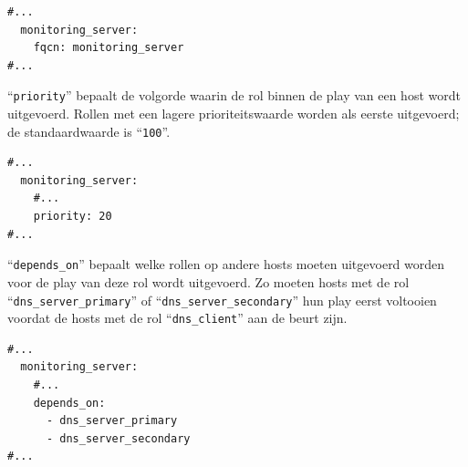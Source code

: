 \begin{codeblockfixed}
  \begin{codeblock}
    \begin{verbatim}
#...
  monitoring_server:
    fqcn: monitoring_server
#...
\end{verbatim}
    \caption[``\texttt{fqcn}'' in ``\texttt{role-config.yml}'']{``\texttt{fqcn}''-key (``\emph{Fully Qualified Collection Name}'') van een rol in ``\texttt{role-config.yml}''}
    \label{code:vb_roleconfig_fqcn}
  \end{codeblock}
\end{codeblockfixed}

``\texttt{priority}'' bepaalt de volgorde waarin de rol binnen de play van een host wordt uitgevoerd. Rollen met een lagere prioriteitswaarde worden als eerste uitgevoerd; de standaardwaarde is ``\texttt{100}''.

\begin{codeblockfixed}
  \begin{codeblock}
    \begin{verbatim}
#...
  monitoring_server:
    #...
    priority: 20
#...
\end{verbatim}
    \caption[``\texttt{priority}'' in ``\texttt{role-config.yml}'']{``\texttt{priority}''-key van een rol in ``\texttt{role-config.yml}''}
    \label{code:vb_roleconfig_priority}
  \end{codeblock}
\end{codeblockfixed}

``\texttt{depends\_on}'' bepaalt welke rollen op andere hosts moeten uitgevoerd worden voor de play van deze rol wordt uitgevoerd. Zo moeten hosts met de rol ``\texttt{dns\_server\_primary}'' of ``\texttt{dns\_server\_secondary}'' hun play eerst voltooien voordat de hosts met de rol ``\texttt{dns\_client}'' aan de beurt zijn.

\begin{codeblockfixed}
  \begin{codeblock}
    \begin{verbatim}
#...
  monitoring_server:
    #...
    depends_on:
      - dns_server_primary
      - dns_server_secondary
#...
\end{verbatim}
    \caption[``\texttt{depends\_on}'' in ``\texttt{role-config.yml}'']{``\texttt{depends\_on}''-key van een rol in ``\texttt{role-config.yml}''}
    \label{code:vb_roleconfig_depends_on}
  \end{codeblock}
\end{codeblockfixed}

